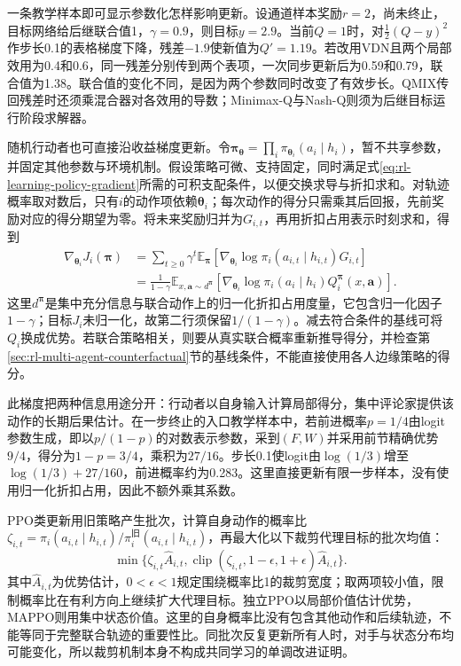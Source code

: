 一条教学样本即可显示参数化怎样影响更新。设通道样本奖励$r=2$，尚未终止，目标网络给后继联合值1，$\gamma=0.9$，则目标$y=2.9$。当前$Q=1$时，对$\tfrac12(Q-y)^2$作步长0.1的表格梯度下降，残差$-1.9$使新值为$Q'=1.19$。若改用VDN且两个局部效用为0.4和0.6，同一残差分别传到两个表项，一次同步更新后为0.59和0.79，联合值为1.38。联合值的变化不同，是因为两个参数同时改变了有效步长。QMIX传回残差时还须乘混合器对各效用的导数；Minimax-Q与Nash-Q则须为后继目标运行阶段求解器。

随机行动者也可直接沿收益梯度更新。令$\bm\pi_{\bm\theta}=\prod_i\pi_{\bm\theta_i}(a_i\mid h_i)$，暂不共享参数，并固定其他参数与环境机制。假设策略可微、支持固定，同时满足式\eqref{eq:rl-learning-policy-gradient}所需的可积支配条件，以便交换求导与折扣求和。对轨迹概率取对数后，只有$i$的动作项依赖$\bm\theta_i$；每次动作的得分只需乘其后回报，先前奖励对应的得分期望为零。将未来奖励归并为$G_{i,t}$，再用折扣占用表示时刻求和，得到
\begin{align}
 \nabla_{\bm\theta_i}J_i(\bm\pi)
 &=\sum_{t\geq0}\gamma^t
   \mathbb E_{\bm\pi}
   [\nabla_{\bm\theta_i}\log\pi_i(a_{i,t}\mid h_{i,t})G_{i,t}]
 \nonumber\\
 &=\frac{1}{1-\gamma}
   \mathbb E_{x,\bm a\sim d^{\bm\pi}}
   [\nabla_{\bm\theta_i}\log\pi_i(a_i\mid h_i)
           Q_i^{\bm\pi}(x,\bm a)].
 \label{eq:rl-multi-agent-policy-gradient}
\end{align}
这里$d^{\bm\pi}$是集中充分信息与联合动作上的归一化折扣占用度量，它包含归一化因子$1-\gamma$；目标$J_i$未归一化，故第二行须保留$1/(1-\gamma)$。减去符合条件的基线可将$Q_i$换成优势。若联合策略相关，则要从真实联合概率重新推导得分，并检查第\ref{sec:rl-multi-agent-counterfactual}节的基线条件，不能直接使用各人边缘策略的得分。

此梯度把两种信息用途分开：行动者以自身输入计算局部得分，集中评论家提供该动作的长期后果估计。在一步终止的入口教学样本中，若前进概率$p=1/4$由logit参数生成，即以$p/(1-p)$的对数表示参数，采到$(F,W)$并采用前节精确优势$9/4$，得分为$1-p=3/4$，乘积为$27/16$。步长0.1使logit由$\log(1/3)$增至$\log(1/3)+27/160$，前进概率约为0.283。这里直接更新有限一步样本，没有使用归一化折扣占用，因此不额外乘其系数。

PPO类更新用旧策略产生批次，计算自身动作的概率比$\zeta_{i,t}=\pi_i(a_{i,t}\mid h_{i,t})/
\pi_i^{\text{旧}}(a_{i,t}\mid h_{i,t})$，再最大化以下裁剪代理目标的批次均值：
\[
 \min\{\zeta_{i,t}\widehat A_{i,t},
       \operatorname{clip}(\zeta_{i,t},1-\epsilon,1+\epsilon)
                      \widehat A_{i,t}\}.
\]
其中$\widehat A_{i,t}$为优势估计，$0<\epsilon<1$规定围绕概率比1的裁剪宽度；取两项较小值，限制概率比在有利方向上继续扩大代理目标。独立PPO以局部价值估计优势，MAPPO则用集中状态价值。这里的自身概率比没有包含其他动作和后续轨迹，不能等同于完整联合轨迹的重要性比。同批次反复更新所有人时，对手与状态分布均可能变化，所以裁剪机制本身不构成共同学习的单调改进证明。

